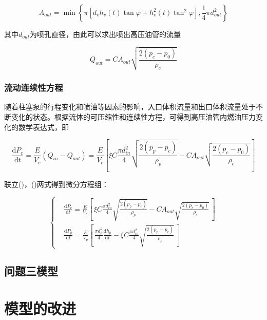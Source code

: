 \documentclass[withoutpreface,bwprint]{cumcmthesis} %
\begin{document}
			\begin{equation}A_{out} = \min\left\{ \pi[d_v h_v(t) \tan \varphi + h_v^2(t) \tan^2\varphi ], \frac{1}{4} \pi d_{out}^2 \right\}\end{equation}
			
			其中$d_{out}$为喷孔直径，由此可以求出喷出高压油管的流量
			
			\begin{equation}Q_{out} = CA_{out} \sqrt{\frac{2(p_c - p_0)}{\rho_c}}\end{equation}
			
			
			
			\subsubsection{流动连续性方程}
			
			随着柱塞泵的行程变化和喷油等因素的影响，入口体积流量和出口体积流量处于不断变化的状态。根据流体的可压缩性和连续性方程，可得到高压油管内燃油压力变化的数学表达式，即
			
			\begin{equation}\frac{\mathrm{d}P_c}{\mathrm{d}t} = \frac{E}{V_c}(Q_{in} - Q_{out}) = \frac{E}{V_c} \left[ \xi C \frac{\pi d_{in}^2}{4} \sqrt{\frac{2(p_p - p_c)}{\rho_p}} - CA_{out} \sqrt{\frac{2(p_c - p_0)}{\rho_c}} \right]\end{equation}
			
			联立()，()两式得到微分方程组：
			
			\begin{equation} \left\{\begin{aligned}&\frac{\mathrm{d}P_c}{\mathrm{d}t} = \frac{E}{V_c} \left[ \, \xi C \frac{\pi d_{in}^2}{4} \sqrt{\frac{2(p_p - p_c)}{\rho_p}} - CA_{out} \sqrt{\frac{2(p_c - p_0)}{\rho_c}} \, \right] \\&\frac{\mathrm{d}P_p}{\mathrm{d}t} = \frac{E}{V_p} \left[ \, \frac{\pi d_p^2}{4}  \frac{\mathrm{d}h_p}{\mathrm{d}t} - \xi C \frac{\pi d_{in}^2}{4} \sqrt{\frac{2(p_p - p_c)}{\rho_p}} \, \right]\end{aligned}\right. \end{equation}
			\subsection{问题三模型}
			
			
			\section{模型的改进}
			
\end{document}
